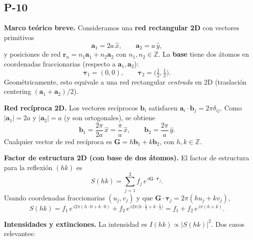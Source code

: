\documentclass{article}
\begin{document}
 
 \subsection{P-10}

\textbf{Marco teórico breve.}  
Consideramos una \textbf{red rectangular 2D} con vectores primitivos
\[
\mathbf{a}_1 = 2a\,\hat{x}, \qquad \mathbf{a}_2 = a\,\hat{y},
\]
y posiciones de red \(\mathbf{r}_{n}=n_1\mathbf{a}_1+n_2\mathbf{a}_2\) con \(n_1,n_2\in\mathbb{Z}\).  
La \textbf{base} tiene dos átomos en coordenadas fraccionarias (respecto a \(\mathbf{a}_1,\mathbf{a}_2\)):
\[
\boldsymbol{\tau}_1=(0,0), \qquad \boldsymbol{\tau}_2=\Big(\tfrac12,\tfrac12\Big).
\]
Geométricamente, esto equivale a una red rectangular \emph{centrada} en 2D (traslación centering \((\mathbf{a}_1+\mathbf{a}_2)/2\)).

\medskip
\textbf{Red recíproca 2D.}  
Los vectores recíprocos \(\mathbf{b}_i\) satisfacen \(\mathbf{a}_i\cdot\mathbf{b}_j=2\pi\delta_{ij}\).  
Como \(|\mathbf{a}_1|=2a\) y \(|\mathbf{a}_2|=a\) (y son ortogonales), se obtiene
\[
\mathbf{b}_1=\frac{2\pi}{2a}\,\hat{x}=\frac{\pi}{a}\,\hat{x}, 
\qquad 
\mathbf{b}_2=\frac{2\pi}{a}\,\hat{y}.
\]
Cualquier vector de red recíproca es \(\mathbf{G}=h\mathbf{b}_1+k\mathbf{b}_2\), con \(h,k\in\mathbb{Z}\).

\medskip
\textbf{Factor de estructura 2D (con base de dos átomos).}  
El factor de estructura para la reflexión \((hk)\) es
\[
S(hk)=\sum_{j=1}^{2} f_j\,e^{\,i\mathbf{G}\cdot\boldsymbol{\tau}_j}.
\]
Usando coordenadas fraccionarias \((u_j,v_j)\) y que \(\mathbf{G}\cdot\boldsymbol{\tau}_j=2\pi(hu_j+kv_j)\),
\[
S(hk)= f_1\,e^{\,i2\pi(h\cdot 0 + k\cdot 0)} + f_2\,e^{\,i2\pi\big(h\cdot \tfrac12 + k\cdot \tfrac12\big)}
= f_1 + f_2\,e^{\,i\pi(h+k)}.
\]

\medskip
\textbf{Intensidades y extinciones.}  
La intensidad es \(I(hk)\propto |S(hk)|^2\). Dos casos relevantes:
\end{document}
